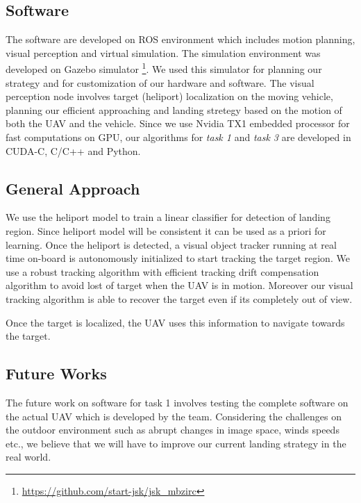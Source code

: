 \documentclass{standalone}
\begin{document}
\subsection{Software}

The software are developed on ROS environment which includes motion planning, visual perception and virtual simulation. The simulation environment was developed on Gazebo simulator \footnote{\url{https://github.com/start-jsk/jsk_mbzirc}}. We used this simulator for planning our strategy and for customization of our hardware and software. The visual perception node involves target (heliport) localization on the moving vehicle, planning our efficient approaching and landing stretegy based on the motion of both the UAV and the vehicle. Since we use Nvidia TX1 embedded processor for fast computations on GPU, our algorithms for \textit{task 1} and \textit{task 3} are developed in CUDA-C, C/C++ and Python. 



\subsection{General Approach}

We use the heliport model to train a linear classifier for detection of landing region. Since heliport model will be consistent it can be used as a priori for learning. Once the heliport is detected, a visual object tracker running at real time on-board is autonomously initialized to start tracking the target region. We use a robust tracking algorithm with efficient tracking drift compensation algorithm to avoid lost of target when the UAV is in motion. Moreover our visual tracking algorithm is able to recover the target even if its completely out of view.


Once the target is localized, the UAV uses this information to navigate towards the target. 



\subsection{Future Works}
The future work on software for task 1 involves testing the complete software on the actual UAV which is developed by the team. Considering the challenges on the outdoor environment such as abrupt changes in image space, winds speeds etc., we believe that we will have to improve our current landing strategy in the real world. 
\end{document}
